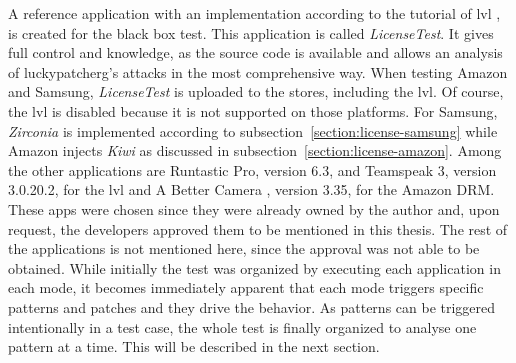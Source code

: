 \newline
A reference application with an implementation according to the tutorial of \gls{lvl} \cite{developersLicensingAdding}, is created for the black box test.
This application is called \textit{LicenseTest}.
It gives full control and knowledge, as the source code is available and allows an analysis of \gls{luckypatcherg}’s attacks in the most comprehensive way.
\newline
When testing Amazon and Samsung, \textit{LicenseTest} is uploaded to the stores, including the \gls{lvl}.
Of course, the \gls{lvl} is disabled because it is not supported on those platforms.
For Samsung, \textit{Zirconia} is implemented according to subsection~\ref{section:license-samsung} while Amazon injects \textit{Kiwi} as discussed in subsection~\ref{section:license-amazon}.
\newline
Among the other applications are Runtastic Pro\cite{runtasticApp}, version 6.3, and Teamspeak 3\cite{teamspeakApp}, version 3.0.20.2, for the \gls{lvl} and A Better Camera \cite{abettercamera}, version 3.35, for the Amazon DRM.
These apps were chosen since they were already owned by the author and, upon request, the developers approved them to be mentioned in this thesis.
The rest of the applications is not mentioned here, since the approval was not able to be obtained.
\newline
While initially the test was organized by executing each application in each mode, it becomes immediately apparent that each mode triggers specific patterns and patches and they drive the behavior.
As patterns can be triggered intentionally in a test case, the whole test is finally organized to analyse one pattern at a time.
This will be described in the next section.
